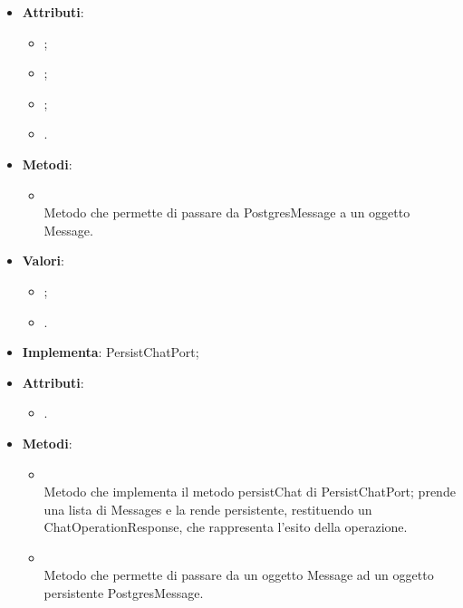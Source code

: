 \documentclass[10pt, a4paper]{article}
\begin{document}
\label{PostgresMessageDettaglio}
\begin{itemize}
    \item \textbf{Attributi}:
    \begin{itemize}
        \item {};
        \item {};        
        \item {};
        \item {}.
    \end{itemize}
    \item \textbf{Metodi}:
    \begin{itemize}
        \item {}\\
        Metodo che permette di passare da PostgresMessage a un oggetto Message.
    \end{itemize}
\end{itemize}

\label{PostgresMessageSenderTypeDettaglio}
\begin{itemize}
    \item \textbf{Valori}:
    \begin{itemize}
        \item {};
        \item {}.
    \end{itemize}
\end{itemize}

\label{PostgresPersistChatDettaglio}
\begin{itemize}
    \item \textbf{Implementa}: PersistChatPort;
    \item \textbf{Attributi}:
    \begin{itemize}
        \item {}.
    \end{itemize}
    \item \textbf{Metodi}:
    \begin{itemize}
        \item {}\\
        Metodo che implementa il metodo persistChat di PersistChatPort; prende una lista di Messages e la rende persistente, restituendo un ChatOperationResponse, che rappresenta l'esito della operazione.
        \item {}\\
        Metodo che permette di passare da un oggetto Message ad un oggetto persistente PostgresMessage.
    \end{itemize}
\end{itemize}
\end{document}
